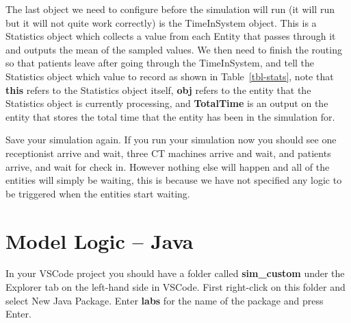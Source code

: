 \documentclass[
  10pt,
  a4paperpaper,
  DIV=11,
  numbers=noendperiod,
  oneside]{scrreprt}
\begin{document}
The last object we need to configure before the simulation will run (it
will run but it will not quite work correctly) is the TimeInSystem
object. This is a Statistics object which collects a value from each
Entity that passes through it and outputs the mean of the sampled
values. We then need to finish the routing so that patients leave after
going through the TimeInSystem, and tell the Statistics object which
value to record as shown in Table~\ref{tbl-stats}, note that
\textbf{this} refers to the Statistics object itself, \textbf{obj}
refers to the entity that the Statistics object is currently processing,
and \textbf{TotalTime} is an output on the entity that stores the total
time that the entity has been in the simulation for.

\begin{table}

\caption{\label{tbl-stats}Collecting Statistics}


\end{table}%

Save your simulation again. If you run your simulation now you should
see one receptionist arrive and wait, three CT machines arrive and wait,
and patients arrive, and wait for check in. However nothing else will
happen and all of the entities will simply be waiting, this is because
we have not specified any logic to be triggered when the entities start
waiting.

\section{Model Logic -- Java}\label{model-logic-java}

In your VSCode project you should have a folder called
\textbf{sim\_custom} under the Explorer tab on the left-hand side in
VSCode. First right-click on this folder and select New Java Package.
Enter \textbf{labs} for the name of the package and press Enter.
\end{document}
